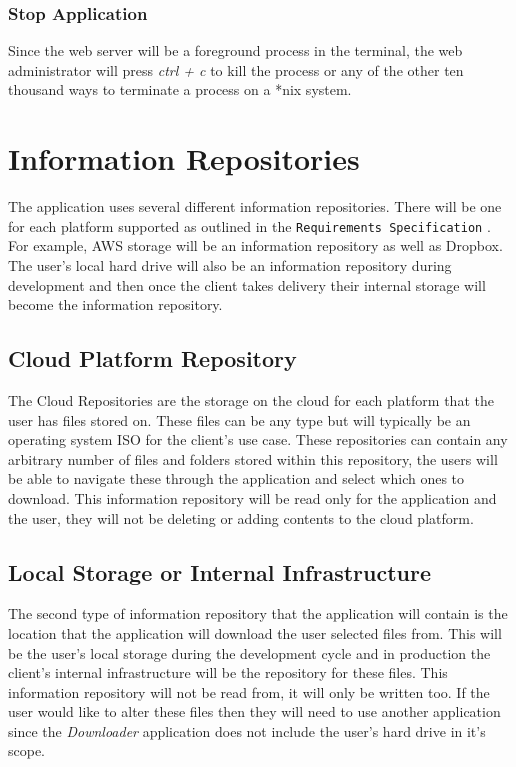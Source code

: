 \documentclass{article}
\begin{document}
      \subsubsection{Stop Application}
      Since the web server will be a foreground process in the terminal, the web administrator will press \textit{ctrl + c}
      to kill the process or any of the other ten thousand ways to terminate a process on a *nix system.

\section{Information Repositories}
The application uses several different information repositories. There will be one for each platform supported as
outlined in the \texttt{Requirements Specification} \cite{reqs}. For example, AWS storage will be an information
repository as well as Dropbox. The user's local hard drive will also be an information repository during
development and then once the client takes delivery their internal storage will become the information repository.

    \subsection{Cloud Platform Repository}
    The Cloud Repositories are the storage on the cloud for each platform that the user has files stored on.
    These files can be any type but will typically be an operating system ISO for the client's use case. These
    repositories can contain any arbitrary number of files and folders stored within this repository, the users
    will be able to navigate these through the application and select which ones to download. This information repository
    will be read only for the application and the user, they will not be deleting or adding contents to the cloud platform.
    
    \subsection{Local Storage or Internal Infrastructure}
    The second type of information repository that the application will contain is the location that the
    application will download the user selected files from. This will be the user's local storage during the
    development cycle and in production the client's internal infrastructure will be the repository for these
    files. This information repository will not be read from, it will only be written too. If the user would like to alter
    these files then they will need to use another application since the \textit{Downloader} application does not
    include the user's hard drive in it's scope.
\end{document}

